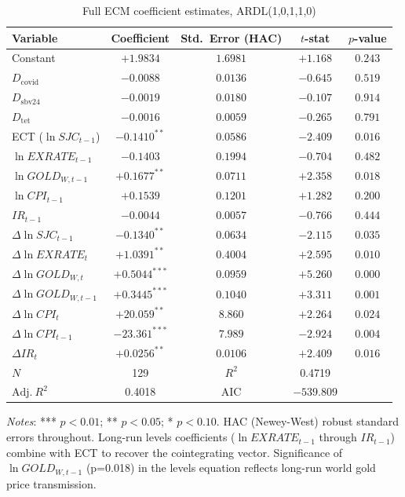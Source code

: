 \documentclass[12pt,a4paper]{article}
\begin{document}
\begin{table}[H]
\caption{Full ECM coefficient estimates, ARDL(1,0,1,1,0)}
\label{tab:ecm_full}
\centering
\small
\begin{tabular}{lcccc}
\toprule
Variable & Coefficient & Std.\ Error (HAC) & $t$-stat & $p$-value \\
\midrule
Constant & $+1.9834$ & $1.6981$ & $+1.168$ & $0.243$ \\
$D_{\text{covid}}$ & $-0.0088$ & $0.0136$ & $-0.645$ & $0.519$ \\
$D_{\text{sbv24}}$ & $-0.0019$ & $0.0180$ & $-0.107$ & $0.914$ \\
$D_{\text{tet}}$ & $-0.0016$ & $0.0059$ & $-0.265$ & $0.791$ \\
ECT ($\ln SJC_{t-1}$) & $-0.1410^{**}$ & $0.0586$ & $-2.409$ & $0.016$ \\
$\ln EXRATE_{t-1}$ & $-0.1403$ & $0.1994$ & $-0.704$ & $0.482$ \\
$\ln GOLD_{W,t-1}$ & $+0.1677^{**}$ & $0.0711$ & $+2.358$ & $0.018$ \\
$\ln CPI_{t-1}$ & $+0.1539$ & $0.1201$ & $+1.282$ & $0.200$ \\
$IR_{t-1}$ & $-0.0044$ & $0.0057$ & $-0.766$ & $0.444$ \\
$\Delta\ln SJC_{t-1}$ & $-0.1340^{**}$ & $0.0634$ & $-2.115$ & $0.035$ \\
$\Delta\ln EXRATE_t$ & $+1.0391^{**}$ & $0.4004$ & $+2.595$ & $0.010$ \\
$\Delta\ln GOLD_{W,t}$ & $+0.5044^{***}$ & $0.0959$ & $+5.260$ & $0.000$ \\
$\Delta\ln GOLD_{W,t-1}$ & $+0.3445^{***}$ & $0.1040$ & $+3.311$ & $0.001$ \\
$\Delta\ln CPI_t$ & $+20.059^{**}$ & $8.860$ & $+2.264$ & $0.024$ \\
$\Delta\ln CPI_{t-1}$ & $-23.361^{***}$ & $7.989$ & $-2.924$ & $0.004$ \\
$\Delta IR_t$ & $+0.0256^{**}$ & $0.0106$ & $+2.409$ & $0.016$ \\
\midrule
$N$ & 129 & $R^2$ & 0.4719 & \\
$\text{Adj.}\ R^2$ & 0.4018 & AIC & $-539.809$ & \\
\bottomrule
\end{tabular}
\begin{minipage}{\linewidth}
\vspace{4pt}
\footnotesize
\textit{Notes}: *** $p<0.01$; ** $p<0.05$; * $p<0.10$. HAC (Newey-West) robust
standard errors throughout. Long-run levels coefficients ($\ln EXRATE_{t-1}$
through $IR_{t-1}$) combine with ECT to recover the cointegrating vector.
Significance of $\ln GOLD_{W,t-1}$ (p=0.018) in the levels equation reflects
long-run world gold price transmission.
\end{minipage}
\end{table}
\end{document}
